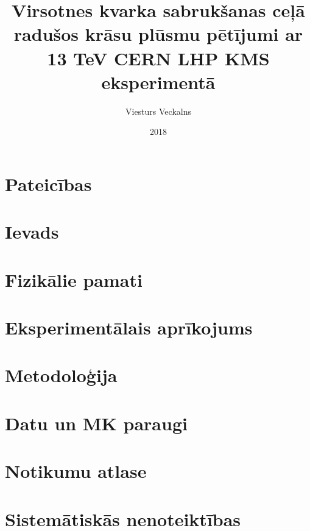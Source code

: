 \documentclass[titlepage, a4paper, LV]{mythesis}
\title{Virsotnes kvarka sabrukšanas ceļā radušos krāsu plūsmu pētījumi ar 13 TeV CERN LHP KMS eksperimentā}
\author{Viesturs Veckalns}
\date{2018}
\begin{document}
\maketitle
\begin{abstract}
        
\end{abstract}

\chapter*{Pateicības}
\label{chap:acknowledgements}


\tableofcontents
\printglossary[toctitle=Terminu tulkojumi, title=Latviešu-angļu terminu tulkojumi]
\listoffigures
\listoftables

\chapter{Ievads}
\label{chap:introduction}


\chapter{Fizikālie pamati}


\chapter{Eksperimentālais aprīkojums}


\chapter{Metodoloģija}
\label{chap:methodology}


\chapter{Datu un MK paraugi}


\chapter{Notikumu atlase}
\label{chap:event_selection}


\chapter{Sistemātiskās nenoteiktības}
\label{chap:systematic_uncertainties}

\end{document}
